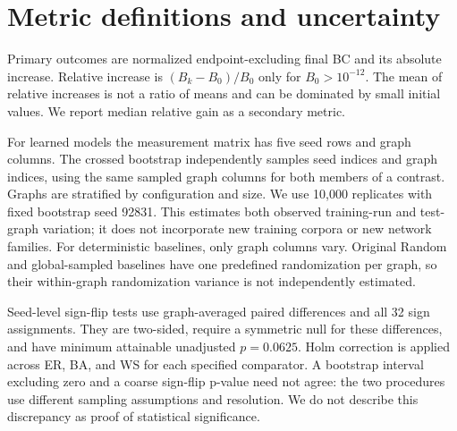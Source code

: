 \documentclass[11pt]{article}
\begin{document}
\section{Metric definitions and uncertainty}
Primary outcomes are normalized endpoint-excluding final BC and its absolute
increase. Relative increase is $(B_k-B_0)/B_0$ only for $B_0>10^{-12}$.
The mean of relative increases is not a ratio of means and can be dominated
by small initial values. We report median relative gain as a secondary metric.

For learned models the measurement matrix has five seed rows and graph columns.
The crossed bootstrap independently samples seed indices and graph indices,
using the same sampled graph columns for both members of a contrast. Graphs
are stratified by configuration and size. We use 10,000 replicates with fixed
bootstrap seed 92831. This estimates both observed training-run and test-graph
variation; it does not incorporate new training corpora or new network families.
For deterministic baselines, only graph columns vary. Original Random and global-sampled
baselines have one predefined randomization per graph, so their within-graph
randomization variance is not independently estimated.

Seed-level sign-flip tests use graph-averaged paired differences and all 32
sign assignments. They are two-sided, require a symmetric null for these
differences, and have minimum attainable unadjusted $p=0.0625$. Holm correction
is applied across ER, BA, and WS for each specified comparator. A bootstrap
interval excluding zero and a coarse sign-flip p-value need not agree: the
two procedures use different sampling assumptions and resolution. We do not
describe this discrepancy as proof of statistical significance.
\end{document}
